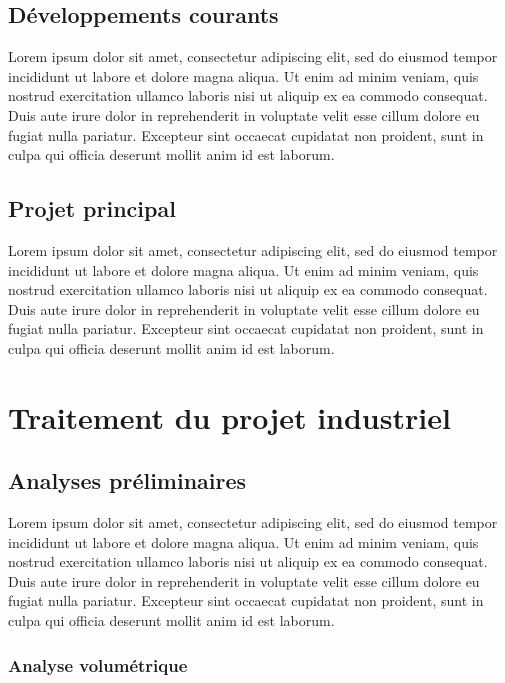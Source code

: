 \documentclass[a4paper, 12pt]{report}
\begin{document}
\section{Développements courants}

Lorem ipsum dolor sit amet, consectetur adipiscing elit, sed do eiusmod tempor incididunt ut labore et dolore magna aliqua. Ut enim ad minim veniam, quis nostrud exercitation ullamco laboris nisi ut aliquip ex ea commodo consequat. Duis aute irure dolor in reprehenderit in voluptate velit esse cillum dolore eu fugiat nulla pariatur. Excepteur sint occaecat cupidatat non proident, sunt in culpa qui officia deserunt mollit anim id est laborum.

\section{Projet principal}

Lorem ipsum dolor sit amet, consectetur adipiscing elit, sed do eiusmod tempor incididunt ut labore et dolore magna aliqua. Ut enim ad minim veniam, quis nostrud exercitation ullamco laboris nisi ut aliquip ex ea commodo consequat. Duis aute irure dolor in reprehenderit in voluptate velit esse cillum dolore eu fugiat nulla pariatur. Excepteur sint occaecat cupidatat non proident, sunt in culpa qui officia deserunt mollit anim id est laborum.

\chapter{Traitement du projet industriel}

\section{Analyses préliminaires}

Lorem ipsum dolor sit amet, consectetur adipiscing elit, sed do eiusmod tempor incididunt ut labore et dolore magna aliqua. Ut enim ad minim veniam, quis nostrud exercitation ullamco laboris nisi ut aliquip ex ea commodo consequat. Duis aute irure dolor in reprehenderit in voluptate velit esse cillum dolore eu fugiat nulla pariatur. Excepteur sint occaecat cupidatat non proident, sunt in culpa qui officia deserunt mollit anim id est laborum.

\subsection{Analyse volumétrique}
\end{document}
